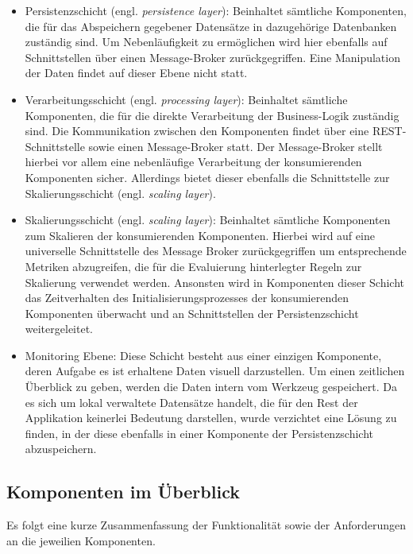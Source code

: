 \begin{itemize}
  \item Persistenzschicht (engl. \emph{persistence layer}): Beinhaltet sämtliche Komponenten, die für das Abspeichern gegebener Datensätze in dazugehörige Datenbanken zuständig sind. Um Nebenläufigkeit zu ermöglichen wird hier ebenfalls auf Schnittstellen über einen Message-Broker zurückgegriffen. Eine Manipulation der Daten findet auf dieser Ebene nicht statt.
  \item Verarbeitungsschicht (engl. \emph{processing layer}): Beinhaltet sämtliche Komponenten, die für die direkte Verarbeitung der Business-Logik zuständig sind. Die Kommunikation zwischen den Komponenten findet über eine REST-Schnittstelle sowie einen Message-Broker statt. Der Message-Broker stellt hierbei vor allem eine nebenläufige Verarbeitung der konsumierenden Komponenten sicher. Allerdings bietet dieser ebenfalls die Schnittstelle zur Skalierungsschicht (engl. \emph{scaling layer}).
  \item Skalierungsschicht (engl. \emph{scaling layer}): Beinhaltet sämtliche Komponenten zum Skalieren der konsumierenden Komponenten. Hierbei wird auf eine universelle Schnittstelle des Message Broker zurückgegriffen um entsprechende Metriken abzugreifen, die für die Evaluierung hinterlegter Regeln zur Skalierung verwendet werden. Ansonsten wird in Komponenten dieser Schicht das Zeitverhalten des Initialisierungsprozesses der konsumierenden Komponenten überwacht und an Schnittstellen der Persistenzschicht weitergeleitet.
  \item Monitoring Ebene: Diese Schicht besteht aus einer einzigen Komponente, deren Aufgabe es ist erhaltene Daten visuell darzustellen. Um einen zeitlichen Überblick zu geben, werden die Daten intern vom Werkzeug gespeichert. Da es sich um lokal verwaltete Datensätze handelt, die für den Rest der Applikation keinerlei Bedeutung darstellen, wurde verzichtet eine Lösung zu finden, in der diese ebenfalls in einer Komponente der Persistenzschicht abzuspeichern.
\end{itemize}


\subsection{Komponenten im Überblick \checkmark}
Es folgt eine kurze Zusammenfassung der Funktionalität sowie der Anforderungen an die jeweilien Komponenten.

